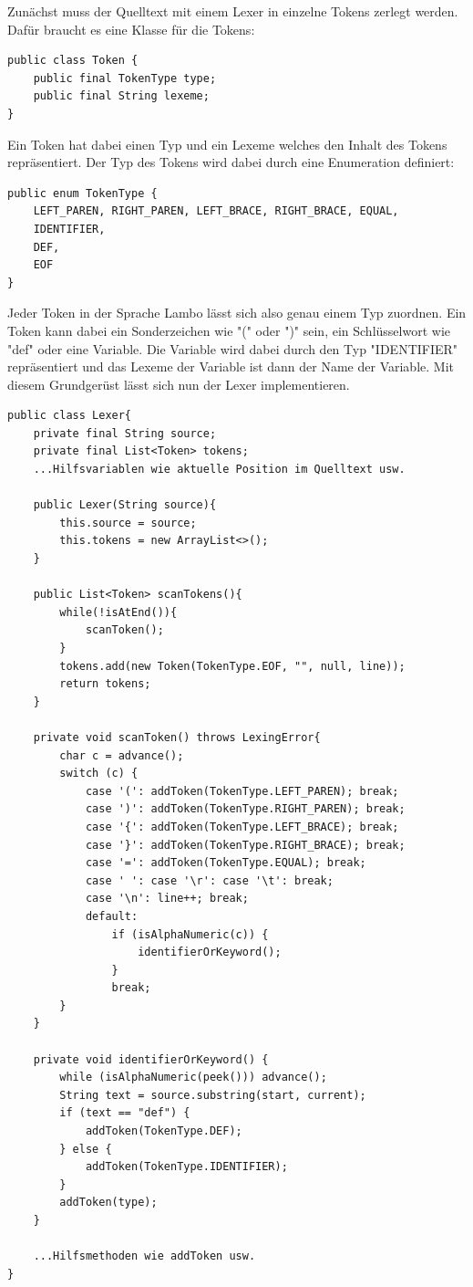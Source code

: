 \documentclass[ngerman]{article}
\begin{document}
Zunächst muss der Quelltext mit einem Lexer in einzelne Tokens zerlegt werden. Dafür braucht es eine Klasse für die Tokens:
\begin{lstlisting}[caption={TODO: Referenz zu Anhang}, captionpos=b]
public class Token {
    public final TokenType type;
    public final String lexeme;
}
\end{lstlisting}
Ein Token hat dabei einen Typ und ein Lexeme welches den Inhalt des Tokens repräsentiert. Der Typ des Tokens wird dabei durch eine Enumeration definiert:
\begin{lstlisting}[caption={TODO: Referenz zu Anhang}, captionpos=b]
public enum TokenType {
    LEFT_PAREN, RIGHT_PAREN, LEFT_BRACE, RIGHT_BRACE, EQUAL,
    IDENTIFIER,
    DEF,
    EOF
}
\end{lstlisting}
Jeder Token in der Sprache Lambo lässt sich also genau einem Typ zuordnen. Ein Token kann dabei ein Sonderzeichen wie "(" oder ")" sein, ein Schlüsselwort wie "def" oder eine Variable. Die Variable wird dabei durch den Typ "IDENTIFIER" repräsentiert und das Lexeme der Variable ist dann der Name der Variable.
Mit diesem Grundgerüst lässt sich nun der Lexer implementieren.
\begin{lstlisting}[caption={TODO: Referenz zu Anhang}, captionpos=b]
public class Lexer{
    private final String source;
    private final List<Token> tokens;
    ...Hilfsvariablen wie aktuelle Position im Quelltext usw. 

    public Lexer(String source){
        this.source = source;
        this.tokens = new ArrayList<>();
    }

    public List<Token> scanTokens(){
        while(!isAtEnd()){
            scanToken();
        }
        tokens.add(new Token(TokenType.EOF, "", null, line));
        return tokens;
    }

    private void scanToken() throws LexingError{
        char c = advance();
        switch (c) {
            case '(': addToken(TokenType.LEFT_PAREN); break;
            case ')': addToken(TokenType.RIGHT_PAREN); break;
            case '{': addToken(TokenType.LEFT_BRACE); break;
            case '}': addToken(TokenType.RIGHT_BRACE); break;
            case '=': addToken(TokenType.EQUAL); break;
            case ' ': case '\r': case '\t': break;
            case '\n': line++; break;
            default:
                if (isAlphaNumeric(c)) {
                    identifierOrKeyword();
                }
                break;
        }
    }

    private void identifierOrKeyword() {
        while (isAlphaNumeric(peek())) advance();
        String text = source.substring(start, current);
        if (text == "def") {
            addToken(TokenType.DEF);
        } else {
            addToken(TokenType.IDENTIFIER);
        }
        addToken(type);
    }

    ...Hilfsmethoden wie addToken usw.
}
\end{lstlisting}
\end{document}
